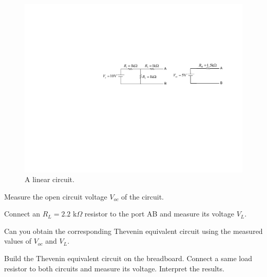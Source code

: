 \documentclass[11pt]{article}
\begin{document}
\begin{question}


\begin{figure}[H]
\centering
\includegraphics[scale=1.2,angle=0]{Fig/cir2.pdf}
\caption{A linear circuit.} \label{fig:cir2}
\end{figure}


\begin{subquestion}{Measure the open circuit voltage $V_{oc}$ of the circuit.} 
\answer{}
\end{subquestion}

\begin{subquestion}{Connect an $R_L=2.2$ k$\Omega$ resistor to the port AB and measure its voltage $V_L$.} 
\answer{}
\end{subquestion}

\begin{subquestion}{Can you obtain the corresponding Thevenin equivalent circuit using the measured values of $V_{oc}$ and $V_L$.} 
\answer{}
\end{subquestion}

\begin{subquestion}{Build the Thevenin equivalent circuit on the breadboard. Connect a same load resistor to both circuits and measure its voltage. Interpret the results.} 
\answer{}
\end{subquestion}

\end{question}
\end{document}
